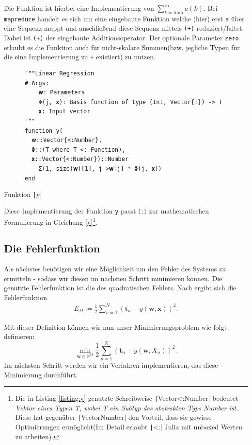 \documentclass{article}
\theoremstyle{plain} %
\theoremstyle{definition} %
\begin{document}
Die Funktion ist hierbei eine Implementierung von $\sum_{k=\text{from}}^\text{to}a(k)$. Bei \texttt{mapreduce} handelt es sich um eine eingebaute Funktion welche (hier) erst \texttt{a} über eine Sequenz mappt und anschließend diese Sequenz mittels \texttt{(+)} reduziert/faltet. Dabei ist \texttt{(+)} der eingebaute Additionsoperator. Der optionale Parameter \texttt{zero} erlaubt es die Funktion auch für nicht-skalare Summen(bzw. jegliche Typen für die eine Implementierung zu \texttt{+} existiert) zu nutzen.

\begin{listing}[H]
    \begin{verbatim}
      """Linear Regression
      # Args:
          𝐰: Parameters
          Φ(j, 𝐱): Basis function of type (Int, Vector{T}) -> T
          𝐱: Input vector
      """
      function y(
        𝐰::Vector{<:Number},
        Φ::(T where T <: Function),
        𝐱::Vector{<:Number})::Number
          Σ(1, size(𝐰)[1], j->𝐰[j] * Φ(j, 𝐱))
      end
    \end{verbatim}
    \caption{Funktion \texttt|y|}
    \label{listing:y}
\end{listing}

Diese Implementierung der Funktion \texttt{y} passt 1:1 zur mathematischen Formulierung in Gleichung \ref{y}\footnote{Die in Listing \ref{listing:y} genutzte Schreibweise \texttt|Vector{<:Number}| bedeutet \emph{Vektor eines Typen T, wobei T ein Subtyp des abstrakten Typs Number ist}. Diese hat gegenüber \texttt|Vector{Number}| den Vorteil, dass sie gewisse Optimierungen ermöglicht(Im Detail erlaubt \texttt|<:| Julia mit unboxed Werten zu arbeiten).}.

\subsection{Die Fehlerfunktion}

Als nächstes benötigen wir eine Möglichkeit um den Fehler des Systems zu ermitteln - sodass wir diesen im nächsten Schritt minimieren können. Die genutzte Fehlerfunktion ist die des quadratischen Fehlers. Nach \cite[S. 140f]{Bishop} ergibt sich die Fehlerfunktion
\begin{align}
    E_D := \frac{1}{2}\sum_{n=1}^{N}(\mathbf{t}_n - y(\mathbf{w}, \mathbf{x}))^2.
\end{align}

Mit dieser Definition können wir nun unser Minimierungsproblem wie folgt definieren:
$$
  \min_{\mathbf{w} \in \mathbb{R}^M} \frac{1}{2}\sum_{n=1}^{N}(\mathbf{t}_n - y(\mathbf{w}, X_n))^2.
$$
Im nächsten Schritt werden wir ein Verfahren implementieren, das diese Minimierung durchführt.
\end{document}
